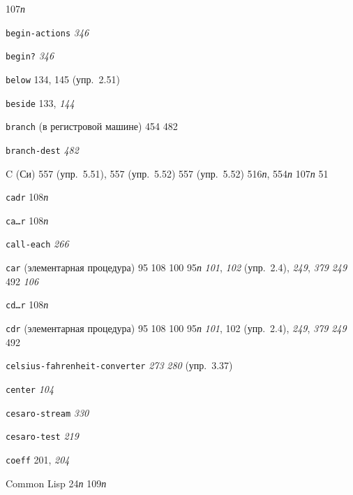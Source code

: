 \begin{theindex}
   107{\it п}
\item {\texttt{begin-actions}} {\it 346}
\item {\texttt{begin?}} {\it 346}
\item {\texttt{below}} 134, 145 (упр.~2.51)
\item {\texttt{beside}} 133, {\it 144}
\item {\texttt{branch} (в регистровой машине)} 454
   482
\item {\texttt{branch-dest}} {\it 482}
\bigskip
\item {C (Си)}
   557 (упр.~5.51), 557 (упр.~5.52)
   557 (упр.~5.52)
   516{\it п}, 554{\it п}
   107{\it п}
   51
\item {\texttt{cadr}} 108{\it п}
\item {\texttt{ca\ldots{}r}} 108{\it п}
\item {\texttt{call-each}} {\it 266}
\item {\texttt{car} (элементарная процедура)} 95
   108
   100
   95{\it п}
   {\it 101}, {\it 102} (упр.~2.4), {\it 249}, {\it 379}
   {\it 249}
   492
   {\it 106}
\item {\texttt{cd\ldots{}r}} 108{\it п}
\item {\texttt{cdr} (элементарная процедура)} 95
   108
   100
   95{\it п}
   {\it 101}, 102 (упр.~2.4), {\it 249}, {\it 379}
   {\it 249}
   492
\item {\texttt{celsius-fahrenheit-converter}} {\it 273}
   {\it 280} (упр.~3.37)
\item {\texttt{center}} {\it 104}
\item {\texttt{cesaro-stream}} {\it 330}
\item {\texttt{cesaro-test}} {\it 219}
\item {\texttt{coeff}} 201, {\it 204}
\item {Common Lisp} 24{\it п}
   109{\it п}

\end{theindex}
